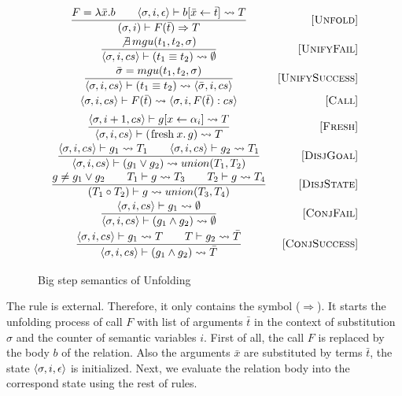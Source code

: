 \begin{figure}[h!]
\[\begin{array}{cr}

\dfrac{ F = \lambda \bar{x}. b \qquad \inbr{\sigma, i, \epsilon} \vdash b[\bar{x} \leftarrow \bar{t}] \leadsto T}
      {(\sigma, i) \vdash F(\bar{t}) \Rightarrow T}
&     \ruleno{Unfold} \\[3mm]
\dfrac{\not\exists \, mgu(t_1, t_2, \sigma)}
      {\inbr{\sigma, i, cs} \vdash (t_1 \equiv t_2) \leadsto \emptyset}
&     \ruleno{UnifyFail}  \\[3mm]
\dfrac{\bar\sigma = mgu(t_1, t_2, \sigma)}
      {\inbr{\sigma, i, cs} \vdash (t_1 \equiv t_2) \leadsto \inbr{\bar\sigma, i, cs}}
&     \ruleno{UnifySuccess}  \\[3mm]
      {\inbr{\sigma, i, cs} \vdash F(\bar{t}) \leadsto \inbr{ \sigma, i, F(\bar{t}) : cs}}
&     \ruleno{Call} \\[2mm]
\dfrac{\inbr{\sigma, i+1, cs} \vdash g[x \leftarrow \alpha_i] \leadsto T}
      {\inbr{\sigma, i, cs} \vdash (\mbox{\lstinline|fresh|} \, x. \, g) \leadsto T}
&     \ruleno{Fresh}  \\[3mm]
\dfrac{\inbr{\sigma, i, cs} \vdash g_1 \leadsto T_1 \qquad \inbr{\sigma, i, cs} \vdash g_2 \leadsto T_1}
      {\inbr{\sigma, i, cs} \vdash (g_1 \lor g_2) \leadsto union(T_1, T_2)}
&     \ruleno{DisjGoal}  \\[3mm]
\dfrac{g \not= g_1 \lor g_2 \qquad T_1 \vdash g \leadsto T_3 \qquad T_2 \vdash g \leadsto T_4}
      {(T_1 \circ T_2) \vdash g \leadsto union(T_3, T_4)}
&     \ruleno{DisjState}  \\[3mm]
\dfrac{\inbr{\sigma, i, cs} \vdash g_1 \leadsto \emptyset}
      {\inbr{\sigma, i, cs} \vdash (g_1 \land g_2) \leadsto \emptyset}
&     \ruleno{ConjFail}  \\[3mm]
\dfrac{\inbr{\sigma, i, cs} \vdash g_1 \leadsto T \qquad T \vdash g_2 \leadsto \bar{T}}
      {\inbr{\sigma, i, cs} \vdash (g_1 \land g_2) \leadsto \bar{T}}
&     \ruleno{ConjSuccess}  \\[3mm]
\end{array}\]

\caption{Big step semantics of Unfolding}
\label{fair:unfolding-semantics}
\end{figure}

The  rule is external.
Therefore, it only contains the symbol ($\Rightarrow$).
It starts the unfolding process of call $F$ with list of arguments $\bar{t}$ in the context of substitution $\sigma$ and the counter of semantic variables $i$.
First of all, the call $F$ is replaced by the body $b$ of the relation. Also the arguments $\bar{x}$ are substituted by terms $\bar{t}$, the state $\langle \sigma, i, \epsilon \rangle$ is initialized. Next, we evaluate the relation body into the correspond state using the rest of rules.

